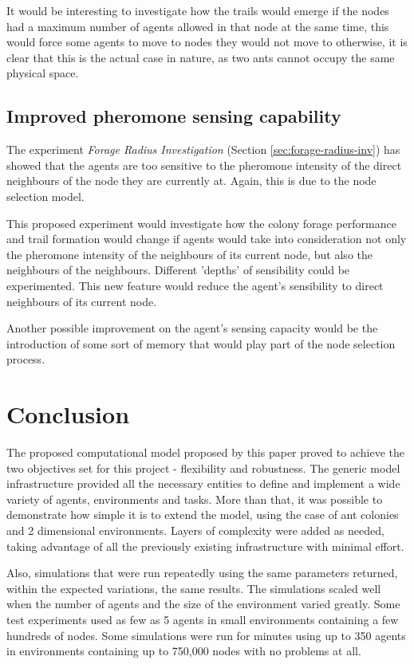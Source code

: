 It would be interesting to investigate how the trails would emerge if the nodes had a maximum number of agents allowed in that node at the same time, this would force some agents to move to nodes they would not move to otherwise, it is clear that this is the actual case in nature, as two ants cannot occupy the same physical space. 

\subsection{Improved pheromone sensing capability}

The experiment \emph{Forage Radius Investigation} (Section \ref{sec:forage-radius-inv}) has showed that the agents are too sensitive to the pheromone intensity of the direct neighbours of the node they are currently at. Again, this is due to the node selection model.

This proposed experiment would investigate how the colony forage performance and trail formation would change if agents would take into consideration not only the pheromone intensity of the neighbours of its current node, but also the neighbours of the neighbours. Different 'depths' of sensibility could be experimented. This new feature would reduce the agent's sensibility to direct neighbours of its current node. 

Another possible improvement on the agent's sensing capacity would be the introduction of some sort of memory that would play part of the node selection process.

\section{Conclusion}

The proposed computational model proposed by this paper proved to achieve the two objectives set for this project - flexibility and robustness. The generic model infrastructure provided all the necessary entities to define and implement a wide variety of agents, environments and tasks. More than that, it was possible to demonstrate how simple it is to extend the model, using the case of ant colonies and 2 dimensional environments. Layers of complexity were added as needed, taking advantage of all the previously existing infrastructure with minimal effort.

Also, simulations that were run repeatedly using the same parameters returned, within the expected variations, the same results. The simulations scaled well when the number of agents and the size of the environment varied greatly. Some test experiments used as few as 5 agents in small environments containing a few hundreds of nodes. Some simulations were run for minutes using up to 350 agents in environments containing up to 750,000 nodes with no problems at all.

